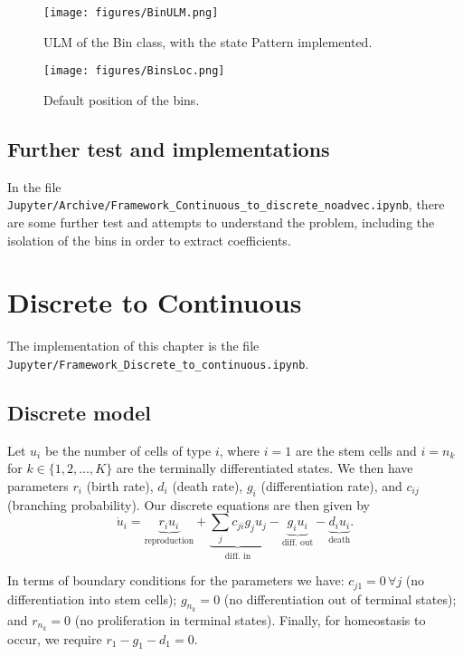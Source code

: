 \documentclass[11pt,oneside]{article}   	%
\begin{document}
\begin{figure}[h!]
\centering
\texttt{[image: figures/BinULM.png]}
\caption{ULM of the Bin class, with the state Pattern implemented.}
\label{fig:ulmbin}
\end{figure}

\begin{figure}[h!]
\centering
\texttt{[image: figures/BinsLoc.png]}
\caption{Default position of the bins.}
\label{fig:binpos}
\end{figure}


\subsection{Further test and implementations}
In the file \texttt{Jupyter/Archive/Framework\_Continuous\_to\_discrete\_noadvec.ipynb}, there are some further test and attempts to understand the problem, including the isolation of the bins in order to extract coefficients.


\section{Discrete to Continuous}
The implementation of this chapter is the file \texttt{Jupyter/Framework\_Discrete\_to\_continuous.ipynb}.
\subsection{Discrete model}
Let $u_i$ be the number of cells of type $i$, where $i=1$ are the stem cells and $i=n_k$ for $k \in \{1,2,\dots,K\}$ are the terminally differentiated states.
We then have parameters $r_i$ (birth rate), $d_i$ (death rate), $g_i$ (differentiation rate), and $c_{ij}$ (branching probability).
Our discrete equations are then given by
\begin{equation}
\dot{u}_i =
\underbrace{r_i u_i}_{\text{reproduction}} +
\underbrace{\sum_j c_{ji} g_j u_j}_{\text{diff. in}} -
\underbrace{g_i u_i}_{\text{diff. out}} -
\underbrace{d_i u_i}_{\text{death}}.
\end{equation}

In terms of boundary conditions for the parameters we have: $c_{j1}=0 \, \forall j$ (no differentiation into stem cells); $g_{n_k}=0$ (no differentiation out of terminal states); and $r_{n_k}=0$ (no proliferation in terminal states).
Finally, for homeostasis to occur, we require ${r_1 - g_1 - d_1 = 0}$.
\end{document}
